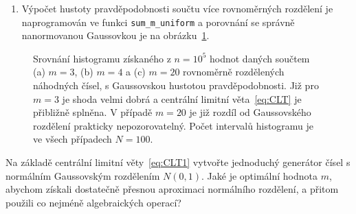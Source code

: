 \documentclass[a4paper,11pt,twoside]{article}
\def\code#1{\textnormal{\texttt{#1}}}
\theoremstyle{red}
\theoremstyle{green}
\begin{document}
\begin{solution}
\begin{enumerate}
            \item  
                Výpočet hustoty pravděpodobnosti součtu více rovnoměrných rozdělení je naprogramován ve funkci \code{sum_m_uniform} a porovnání se správně nanormovanou Gaussovkou je na obrázku~\ref{fig:Gaussian}. 
        \end{enumerate}

        \begin{figure}[!htb]
            \begin{subfigure}{0.33\linewidth}
                \centering{}
                \caption{}
            \end{subfigure}
            \begin{subfigure}{0.33\linewidth}
                \centering{}
                \caption{}
            \end{subfigure}
            \begin{subfigure}{0.33\linewidth}
                \centering{}
                \caption{}
            \end{subfigure}
            \caption{
                \protect\small
                Srovnání histogramu získaného z $n=10^{5}$ hodnot daných součtem (a) $m=3$, (b) $m=4$ a (c) $m=20$ rovnoměrně rozdělených náhodných čísel, s Gaussovskou hustotou pravděpodobnosti. 
                Již pro $m=3$ je shoda velmi dobrá a centrální limitní věta~\eqref{eq:CLT} je přibližně splněna.
                V případě $m=20$ je již rozdíl od Gaussovského rozdělení prakticky nepozorovatelný.
                Počet intervalů histogramu je ve všech případech $N=100$.
            }
            \label{fig:Gaussian}
        \end{figure}    
    \end{solution}

    \begin{solved}\label{task:NormalDistribution}
        Na základě centrální limitní věty~\eqref{eq:CLT1} vytvořte jednoduchý generátor čísel s normálním Gaussovským rozdělením $N(0,1)$.
        Jaké je optimální hodnota $m$, abychom získali dostatečně přesnou aproximaci normálního rozdělení, a přitom použili co nejméně algebraických operací?
    \end{solved}
\end{document}
